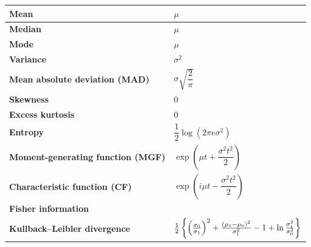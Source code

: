 \begin{customTableWrapper}{2}
\begin{longtable}{|m{6cm}|p{9cm}|}
    \textbf{Mean} & 
    $\mu$
    \\ \hline

    \textbf{Median} & 
    $\mu$
    \\ \hline

    \textbf{Mode} & 
    $\mu$
    \\ \hline

    \textbf{Variance} &
    $\sigma^2$
    \\ \hline

    \textbf{Mean absolute deviation (MAD)} &
    ${ \sigma {\sqrt {\dfrac{2}{\pi} }}}$ 
    \\[1ex] \hline

    \textbf{Skewness} &
    $0$ 
    \\ \hline

    \textbf{Excess kurtosis} &
    $0$ 
    \\ \hline

    \textbf{Entropy} &
    ${ {\dfrac {1}{2}}\log(2\pi e\sigma ^{2})}$
    \\[1ex] \hline

    \textbf{Moment-generating function (MGF)} &
    ${ \exp(\mu t+\dfrac{\sigma ^{2}t^{2}}{2})}$
    \\[1ex] \hline

    \textbf{Characteristic function (CF)} &
    ${ \exp(i\mu t-\dfrac{\sigma ^{2}t^{2}}{2})}$
    \\[1ex] \hline

    \textbf{Fisher information} &
    \tableenumerate{
        \item ${ {\mathcal {I}}(\mu ,\sigma )={\begin{pmatrix}1/\sigma ^{2}&0\\0&2/\sigma ^{2}\end{pmatrix}}}$
        \vspace{0.1cm}

        \item ${ {\mathcal {I}}(\mu ,\sigma ^{2})={\begin{pmatrix}1/\sigma ^{2}&0\\0&1/(2\sigma ^{4})\end{pmatrix}}}$
        \vspace{0.1cm}
    }
    \\[1ex] \hline

    \textbf{Kullback–Leibler divergence} &
    ${ {1 \over 2}\left\{\left({\frac {\sigma _{0}}{\sigma _{1}}}\right)^{2}+{\frac {(\mu _{1}-\mu _{0})^{2}}{\sigma _{1}^{2}}}-1+\ln {\sigma _{1}^{2} \over \sigma _{0}^{2}}\right\}}$
    \\[2ex] \hline

\end{longtable}
\end{customTableWrapper}












